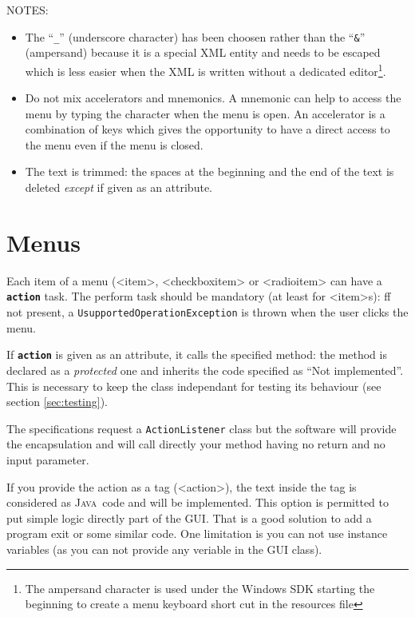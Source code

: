 \documentclass[a4paper,onecolumn,10pt]{book}
\newcommand{\jclass}[1]{\texttt{\small #1}}
\newcommand{\JAVA}{\textsc{Java}}
\newcommand{\tag}[1]{\textsf{<#1>}}
\newcommand{\attr}[1]{\texttt{\small \textbf{#1}}}
\begin{document}
NOTES:
\begin{itemize}
  \item The ``\verb|_|'' (underscore character) has been choosen rather than the
		``\verb|&|'' (ampersand) because it is a special XML entity and needs to be
		escaped which is less easier when the XML is written without a dedicated
		editor\footnote{The ampersand character is used under the Windows SDK starting
		the beginning to create a menu keyboard short cut in the resources file}.
  \item Do not mix accelerators and mnemonics. A mnemonic can help to access the menu by
		typing the character when the menu is open. An accelerator is a combination of
		keys which gives the opportunity to have a direct access to the menu even if
		the menu is closed.
  \item The text is trimmed: the spaces at the beginning and the end of
    the text is deleted \emph{except} if given as an attribute.
\end{itemize}

 

\section{Menus}
Each item of a menu (\tag{item}, \tag{checkboxitem} or \tag{radioitem} can
have a \attr{action} task. The perform task should be mandatory
(at least for \tag{item}s): ff not
present, a \jclass{UsupportedOperationException} is thrown when the user clicks
the menu.

 
If \attr{action} is given as an attribute, it calls the specified method:
the method is declared as a \emph{protected} one and inherits the code specified
as ``Not implemented''. This is necessary to keep the class independant for
testing its behaviour (see section \ref{sec:testing}).
 

The specifications request a \jclass{ActionListener} class but the software will
provide the encapsulation and will call directly your method having no return
and no input parameter.

If you provide the action as a tag (\tag{action}), the text inside 
the tag is considered as
\JAVA\ code and will be implemented. This option is permitted to put simple logic
directly part of the GUI. That is a good solution to add a program exit or
some similar code. One limitation is you can not use instance variables (as
you can not provide any veriable in the GUI class).

 
\end{document}
